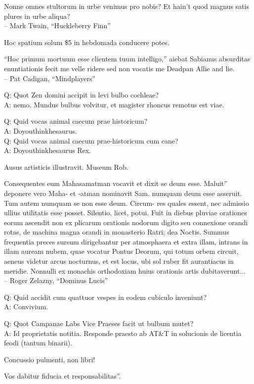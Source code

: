 \documentclass[titlepage,12pt]{memoir}
\begin{document}
Nonne omnes stultorum in urbe venimus pro nobis? Et hain’t quod magnus
satis plures in urbe aliqua?
\\-- Mark Twain, “Huckleberry Finn”

Hoc spatium solum \$5 in hebdomada conducere potes.

 “Hoc primum mortuum esse clientem tuum intelligo,” aiebat Sabianus
absurditas enuntiationis fecit me velle ridere sed non vocatis me
Deadpan Allie and lie.
\\-- Pat Cadigan, “Mindplayers”

Q: Quot Zen domini accipit in levi bulbo cochleae?\\
A: nemo. Mundus bulbus volvitur, et magister rhoncus remotus est
viae.

Q: Quid vocas animal caecum prae historicum?\\
A: Doyouthinkhesaurus.\\
Q: Quid vocas animal caecum prae-historicum cum cane?\\
A: Doyouthinkhesaurus Rex.

Ausus artisticis illustravit. Museum Rob.

Consequentes eum Mahasamatman vocavit et dixit se deum esse. Maluit”
deponere vero Maha- et -atman nominavit Sam. numquam
deum esse asseruit. Tum autem numquam se non esse deum. Circum-
res quales essent, nec admissio ullius utilitatis esse posset.
Silentio, licet, potui. Fuit in diebus pluviae orationes eorum
ascendit non ex plicarum orationis nodorum digito seu connexione
orandi rotas, de machina magna orandi in monasterio Ratri;
dea Noctis. Summus frequentia preces sursum dirigebantur per
atmosphaera et extra illam, intrans in illam auream nubem, quae vocatur
Pontus Deorum, qui totum orbem circuit, aeneus videtur
arcus nocturnus, et est locus, ubi sol ruber fit aurantiacus in meridie.
Nonnulli ex monachis orthodoxiam huius orationis artis dubitaverunt...
\\-- Roger Zelazny, “Dominus Lucis”

Q: Quid accidit cum quattuor vespes in eodem cubiculo inveniunt?\\
A: Convivium.

Q: Quot Campanae Labs Vice Praeses facit ut bulbum mutet?\\
A: Id proprietatis notitia. Responde praesto ab AT\&T in solucionis
de licentia feodi (tantum binarii).

Concussio pulmenti, non libri!

Vos dabitur fiducia et responsabilitas”.
\end{document}
